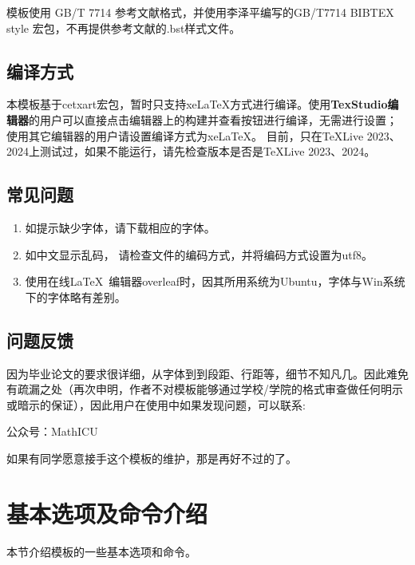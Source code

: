 模板使用 GB/T 7714 参考文献格式，并使用李泽平编写的GB/T7714 BIBTEX style 宏包，不再提供参考文献的.bst样式文件。

\subsection{编译方式}
本模板基于cetxart宏包，暂时只支持xeLaTeX方式进行编译。使用{\bfseries TexStudio编辑器}的用户可以直接点击编辑器上的构建并查看按钮进行编译，无需进行设置； 使用其它编辑器的用户请设置编译方式为xeLaTeX。 {\color{red}目前，只在TeXLive 2023、2024上测试过，如果不能运行，请先检查版本是否是TeXLive 2023、2024。}

\subsection{常见问题}

\begin{enumerate}
    \item 如提示缺少字体，请下载相应的字体。
    \item 如中文显示乱码， 请检查文件的编码方式，并将编码方式设置为utf8。
    \item 使用在线\LaTeX~编辑器overleaf时，因其所用系统为Ubuntu，字体与Win系统下的字体略有差别。
\end{enumerate}

\subsection{问题反馈}
因为毕业论文的要求很详细，从字体到到段距、行距等，细节不知凡几。因此难免有疏漏之处{\color{red}（再次申明，作者不对模板能够通过学校/学院的格式审查做任何明示或暗示的保证）}，因此用户在使用中如果发现问题，可以联系:
\begin{center}
公众号：MathICU
\end{center}

{\large \color{red}如果有同学愿意接手这个模板的维护，那是再好不过的了。}



\section{基本选项及命令介绍}\label{sec:basic}
本节介绍模板的一些基本选项和命令。



